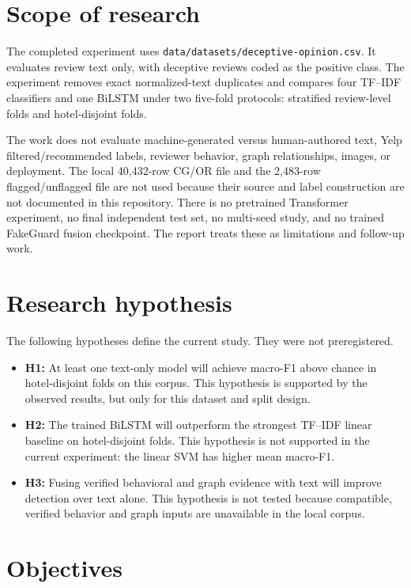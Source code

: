 \documentclass[12pt,a4paper]{report}
\begin{document}
\section{Scope of research}

The completed experiment uses \texttt{data/datasets/deceptive-opinion.csv}. It evaluates review text only, with deceptive reviews coded as the positive class. The experiment removes exact normalized-text duplicates and compares four TF--IDF classifiers and one BiLSTM under two five-fold protocols: stratified review-level folds and hotel-disjoint folds.

The work does not evaluate machine-generated versus human-authored text, Yelp filtered/recommended labels, reviewer behavior, graph relationships, images, or deployment. The local 40,432-row CG/OR file and the 2,483-row flagged/unflagged file are not used because their source and label construction are not documented in this repository. There is no pretrained Transformer experiment, no final independent test set, no multi-seed study, and no trained FakeGuard fusion checkpoint. The report treats these as limitations and follow-up work.

\section{Research hypothesis}

The following hypotheses define the current study. They were not preregistered.

\begin{itemize}
    \item \textbf{H1:} At least one text-only model will achieve macro-F1 above chance in hotel-disjoint folds on this corpus. This hypothesis is supported by the observed results, but only for this dataset and split design.
    \item \textbf{H2:} The trained BiLSTM will outperform the strongest TF--IDF linear baseline on hotel-disjoint folds. This hypothesis is not supported in the current experiment: the linear SVM has higher mean macro-F1.
    \item \textbf{H3:} Fusing verified behavioral and graph evidence with text will improve detection over text alone. This hypothesis is not tested because compatible, verified behavior and graph inputs are unavailable in the local corpus.
\end{itemize}

\section{Objectives}
\end{document}
